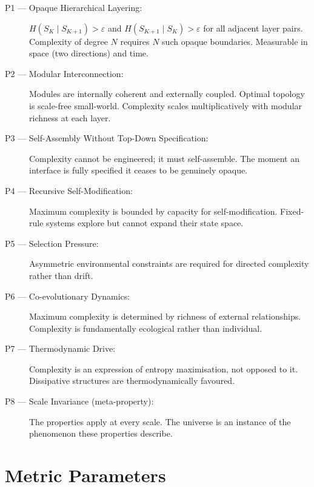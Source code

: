 \documentclass[12pt,a4paper]{article}
\begin{document}
\begin{description}
  \item[P1 --- Opaque Hierarchical Layering:]
    $H(S_K \mid S_{K+1}) > \varepsilon$ and
    $H(S_{K+1} \mid S_K) > \varepsilon$ for all adjacent layer pairs.
    Complexity of degree $N$ requires $N$ such opaque boundaries.
    Measurable in space (two directions) and time.

  \item[P2 --- Modular Interconnection:]
    Modules are internally coherent and externally coupled.
    Optimal topology is scale-free small-world.
    Complexity scales multiplicatively with modular richness at each layer.

  \item[P3 --- Self-Assembly Without Top-Down Specification:]
    Complexity cannot be engineered; it must self-assemble.
    The moment an interface is fully specified it ceases to be genuinely opaque.

  \item[P4 --- Recursive Self-Modification:]
    Maximum complexity is bounded by capacity for self-modification.
    Fixed-rule systems explore but cannot expand their state space.

  \item[P5 --- Selection Pressure:]
    Asymmetric environmental constraints are required for directed
    complexity rather than drift.

  \item[P6 --- Co-evolutionary Dynamics:]
    Maximum complexity is determined by richness of external relationships.
    Complexity is fundamentally ecological rather than individual.

  \item[P7 --- Thermodynamic Drive:]
    Complexity is an expression of entropy maximisation, not opposed to it.
    Dissipative structures are thermodynamically favoured.

  \item[P8 --- Scale Invariance (meta-property):]
    The properties apply at every scale.
    The universe is an instance of the phenomenon these properties describe.
\end{description}

\section{Metric Parameters}
\end{document}
